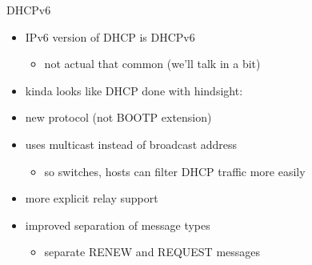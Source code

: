 \begin{frame}{DHCPv6}
    \begin{itemize}
    \item IPv6 version of DHCP is DHCPv6
        \begin{itemize}
        \item not actual that common (we'll talk in a bit)
        \end{itemize}
    \item kinda looks like DHCP done with hindsight:
    \vspace{.5cm}
    \item new protocol (not BOOTP extension)
    \item uses multicast instead of broadcast address
        \begin{itemize}
        \item so switches, hosts can filter DHCP traffic more easily
        \end{itemize}
    \item more explicit relay support
    \item improved separation of message types
        \begin{itemize}
        \item separate RENEW and REQUEST messages
        \end{itemize}
    \end{itemize}
\end{frame}

